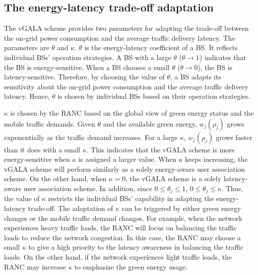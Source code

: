 \documentclass[journal]{IEEEtran}
\theoremstyle{definition}
\begin{document}
\subsection{The energy-latency trade-off adaptation}
\label{subsec:energy_latency_trade}
The vGALA scheme provides two parameters for adapting the trade-off between the on-grid power consumption and the average traffic delivery latency. The parameters are $\theta$ and $\kappa$. $\theta$ is the energy-latency coefficient of a BS. It reflects individual BSs' operation strategies. A BS with a large $\theta$ ($\theta \rightarrow 1$) indicates that the BS is energy-sensitive. When a BS chooses a small $\theta$ ($\theta \rightarrow 0$), the BS is latency-sensitive. Therefore, by choosing the value of $\theta$, a BS adapts its sensitivity about the on-grid power consumption and the average traffic delivery latency. Hence, $\theta$ is chosen by individual BSs based on their operation strategies.

$\kappa$ is chosen by the RANC based on the global view of green energy status and the mobile traffic demands. Given $\theta$ and the available green energy, $w_{j}(\rho_{j})$ grows exponentially as the traffic demand increases. For a large $\kappa$, $w_{j}(\rho_{j})$ grows faster than it does with a small $\kappa$. This indicates that the vGALA scheme is more energy-sensitive when $\kappa$ is assigned a larger value. When $\kappa$ keeps increasing, the vGALA scheme will perform similarly as a solely energy-aware user association scheme. On the other hand, when $\kappa=0$, the vGALA scheme is a solely latency-aware user association scheme. In addition, since $0\leq \theta_{j}\leq 1$, $0\leq \theta_{j}\leq \kappa$. Thus, the value of $\kappa$ restricts the individual BSs' capability in adapting the energy-latency trade-off. The adaptation of $\kappa$ can be triggered by either green energy changes or the mobile traffic demand changes. For example, when the network experiences heavy traffic loads, the RANC will focus on balancing the traffic loads to reduce the network congestion. In this case, the RANC may choose a small $\kappa$ to give a high priority to the latency awareness in balancing the traffic loads. On the other hand, if the network experiences light traffic loads, the RANC may increase $\kappa$ to emphasize the green energy usage.
\end{document}
